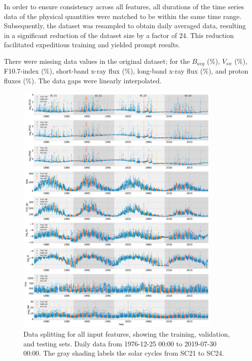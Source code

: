 In order to ensure consistency across all features, all durations of the time series data of the physical quantities were matched to be within the same time range. Subsequently, the dataset was resampled to obtain daily averaged data, resulting in a significant reduction of the dataset size by a factor of 24. This reduction facilitated expeditious training and yielded prompt results.

There were missing data values in the original dataset; for the $B_{avg}$ (\%), $V_{sw}$ (\%), F10.7-index (\%), short-band x-ray flux (\%), long-band x-ray flux (\%), and proton fluxes (\%). The data gaps were linearly interpolated.

\begin{figure}[h!]
	\centering
    \includegraphics[width=0.9\textwidth]{chapter4/figs/subplots_dataSplit_allFeatures.pdf}
    \caption{Data splitting for all input features, showing the training, validation, and testing sets. Daily data from 1976-12-25 00:00 to 2019-07-30 00:00. The gray shading labels the solar cycles from SC21 to SC24.}
\label{fig_allFeatures}
\end{figure}

